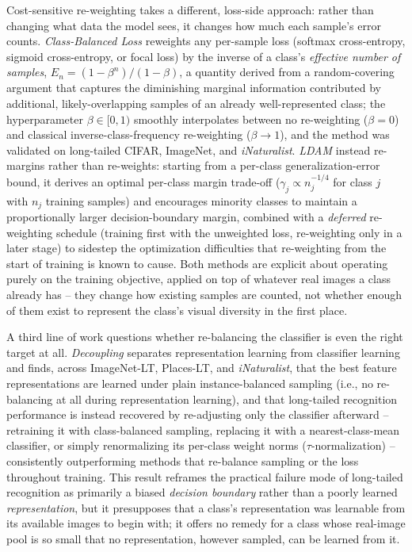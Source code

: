 Cost-sensitive re-weighting takes a different, loss-side approach: rather than changing what data the model sees, it changes how much each sample's error counts. \textit{Class-Balanced Loss} \cite{cuiClassBalancedLossBased2019} reweights any per-sample loss (softmax cross-entropy, sigmoid cross-entropy, or focal loss) by the inverse of a class's \textit{effective number of samples}, $E_n = (1-\beta^n)/(1-\beta)$, a quantity derived from a random-covering argument that captures the diminishing marginal information contributed by additional, likely-overlapping samples of an already well-represented class; the hyperparameter $\beta \in [0,1)$ smoothly interpolates between no re-weighting ($\beta=0$) and classical inverse-class-frequency re-weighting ($\beta \to 1$), and the method was validated on long-tailed CIFAR, ImageNet, and \textit{iNaturalist}. \textit{LDAM} \cite{caoLearningImbalancedDatasets2019} instead re-margins rather than re-weights: starting from a per-class generalization-error bound, it derives an optimal per-class margin trade-off ($\gamma_j \propto n_j^{-1/4}$ for class $j$ with $n_j$ training samples) and encourages minority classes to maintain a proportionally larger decision-boundary margin, combined with a \textit{deferred} re-weighting schedule (training first with the unweighted loss, re-weighting only in a later stage) to sidestep the optimization difficulties that re-weighting from the start of training is known to cause. Both methods are explicit about operating purely on the training objective, applied on top of whatever real images a class already has -- they change how existing samples are counted, not whether enough of them exist to represent the class's visual diversity in the first place.

A third line of work questions whether re-balancing the classifier is even the right target at all. \textit{Decoupling} \cite{kangDecouplingRepresentationClassifier2020} separates representation learning from classifier learning and finds, across ImageNet-LT, Places-LT, and \textit{iNaturalist}, that the best feature representations are learned under plain instance-balanced sampling (i.e., no re-balancing at all during representation learning), and that long-tailed recognition performance is instead recovered by re-adjusting only the classifier afterward -- retraining it with class-balanced sampling, replacing it with a nearest-class-mean classifier, or simply renormalizing its per-class weight norms ($\tau$-normalization) -- consistently outperforming methods that re-balance sampling or the loss throughout training. This result reframes the practical failure mode of long-tailed recognition as primarily a biased \textit{decision boundary} rather than a poorly learned \textit{representation}, but it presupposes that a class's representation was learnable from its available images to begin with; it offers no remedy for a class whose real-image pool is so small that no representation, however sampled, can be learned from it.

